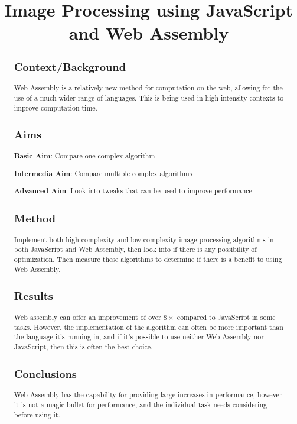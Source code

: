 \documentclass[12pt,a4paper]{article}
\title{Image Processing using JavaScript and Web Assembly}
\author{} %
\date{}
\begin{document}
\maketitle

\begin{abstract}
    \subsection{Context/Background}
    Web Assembly is a relatively new method for computation on the web, allowing for the use of a much wider range of languages. This is being used in high intensity contexts to improve computation time.

    \subsection{Aims}

    \textbf{Basic Aim}: Compare one complex algorithm

    \textbf{Intermedia Aim}: Compare multiple complex algorithms

    \textbf{Advanced Aim}: Look into tweaks that can be used to improve performance

    \subsection{Method}

    Implement both high complexity and low complexity image processing algorithms in both JavaScript and Web Assembly, then look into if there is any possibility of optimization.
    Then measure these algorithms to determine if there is a benefit to using Web Assembly.

    \subsection{Results}

    Web assembly can offer an improvement of over $8\times$ compared to JavaScript in some tasks. However, the implementation of the algorithm can often be more important than the language it's running in, and if it's possible to use neither Web Assembly nor JavaScript, then this is often the best choice.

    \subsection{Conclusions}

    Web Assembly has the capability for providing large increases in performance, however it is not a magic bullet for performance, and the individual task needs considering before using it.
\end{abstract}
\end{document}
